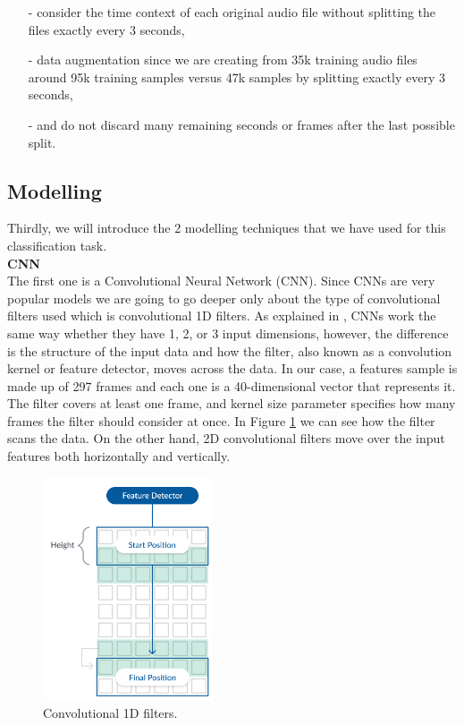 \documentclass[12pt]{extarticle}
\begin{document}
\begin{itemize}
    \item[-] consider the time context of each original audio file without splitting the files exactly every 3 seconds,
    \item[-] data augmentation since we are creating from 35k training audio files around 95k training samples versus 47k samples by splitting exactly every 3 seconds,
    \item[-] and do not discard many remaining seconds or frames after the last possible split.
\end{itemize}

\subsection{Modelling} \label{Modelling}

\noindent Thirdly, we will introduce the 2 modelling techniques that we have used for this classification task.\\

\noindent \textbf{CNN}\\

\noindent The first one is a Convolutional Neural Network (CNN). Since CNNs are very popular models we are going to go deeper only about the type of convolutional filters used which is convolutional 1D filters. As explained in \cite{Conv1DKeras}, CNNs work the same way whether they have 1, 2, or 3 input dimensions, however, the difference is the structure of the input data and how the filter, also known as a convolution kernel or feature detector, moves across the data. In our case, a features sample is made up of 297 frames and each one is a 40-dimensional vector that represents it. The filter covers at least one frame, and kernel size parameter specifies how many frames the filter should consider at once. In Figure \ref{fig3} we can see how the filter scans the data. On the other hand, 2D convolutional filters move over the input features both horizontally and vertically.

\begin{figure}[h]
\centering
\includegraphics[width=5cm]{Figures/3.png}
\caption{Convolutional 1D filters.}
\label{fig3}
\end{figure}
\end{document}
